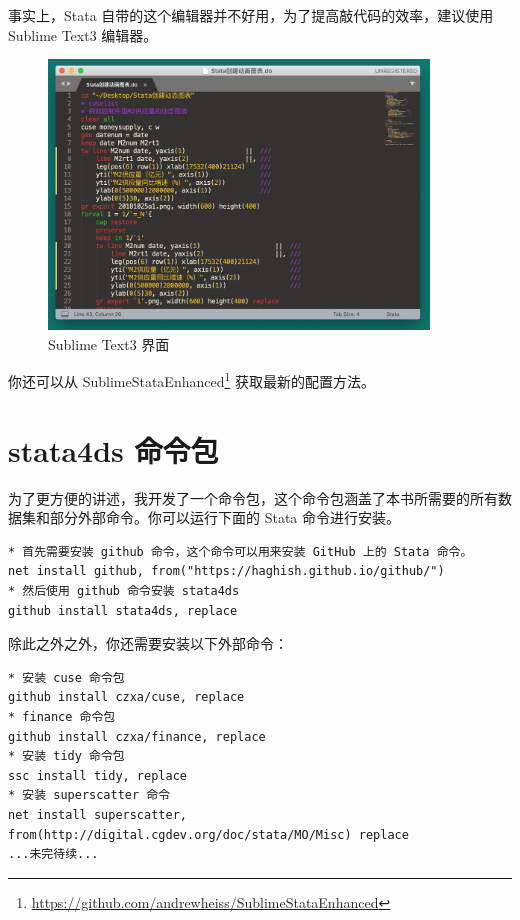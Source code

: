 \documentclass[]{ctexbook}
\renewcommand{\href}[2]{#2\footnote{\url{#1}}}
\begin{document}
事实上，Stata 自带的这个编辑器并不好用，为了提高敲代码的效率，建议使用 Sublime Text3 编辑器。

\begin{figure}

{\centering \includegraphics[width=0.9\textwidth]{assets/sublime} 

}

\caption{Sublime Text3 界面}\label{fig:sublime}
\end{figure}

你还可以从 \href{https://github.com/andrewheiss/SublimeStataEnhanced}{SublimeStataEnhanced} 获取最新的配置方法。

\hypertarget{stata4ds-}{%
\section{stata4ds 命令包}\label{stata4ds-}}

为了更方便的讲述，我开发了一个命令包，这个命令包涵盖了本书所需要的所有数据集和部分外部命令。你可以运行下面的 Stata 命令进行安装。

\begin{lstlisting}
* 首先需要安装 github 命令，这个命令可以用来安装 GitHub 上的 Stata 命令。
net install github, from("https://haghish.github.io/github/")
* 然后使用 github 命令安装 stata4ds
github install stata4ds, replace
\end{lstlisting}

除此之外之外，你还需要安装以下外部命令：

\begin{lstlisting}
* 安装 cuse 命令包
github install czxa/cuse, replace
* finance 命令包
github install czxa/finance, replace
* 安装 tidy 命令包
ssc install tidy, replace
* 安装 superscatter 命令
net install superscatter, from(http://digital.cgdev.org/doc/stata/MO/Misc) replace
...未完待续...
\end{lstlisting}
\end{document}
